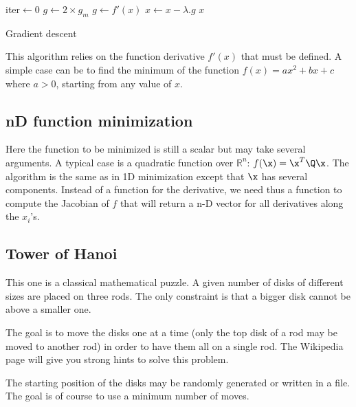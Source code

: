 \documentclass{ecnreport}
\begin{document}
\begin{algorithm}[!h]
{}
iter$\gets$0\;
$g\gets2\times g_m$\;
{
$g\gets f'(x)$\;
$x\gets x - \lambda.g$\;
}
\Return $x$\;
\caption{Gradient descent}
\label{algo:grad}
\end{algorithm}

This algorithm relies on the function derivative $f'(x)$ that must be defined. A simple case can be to find the minimum of the function $f(x) = ax^2+bx+c$ where $a>0$, starting from any value of $x$.

\begin{itemize}
 \end{itemize}
 
\subsection{nD function minimization}

Here the function to be minimized is still a scalar but may take several arguments. A typical case is a quadratic function over $\mathbb{R}^n$: $f(\x) = \x^T\Q\x$. The algorithm is the same as in 1D minimization except that $\x$ has several components. Instead of a function for the derivative, we need thus a function to compute the Jacobian of $f$ that will return a n-D vector for all derivatives along the $x_i$'s. 

\begin{itemize}
 \end{itemize}

 
\subsection{Tower of Hanoi}

This one is a classical mathematical puzzle.
A given number of disks of different sizes are placed on three rods.
The only constraint is that a bigger disk cannot be above a smaller one. 

The goal is to move the disks one at a time (only the top disk of a rod may be moved to another rod) in order to have them all on a single rod.
The Wikipedia page will give you strong hints to solve this problem.

The starting position of the disks may be randomly generated or written in a file. The goal is of course to use a minimum number of moves.
\end{document}
